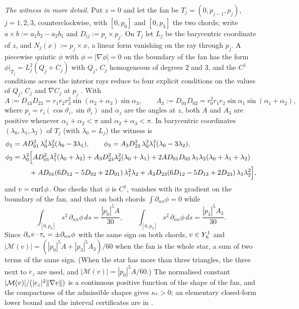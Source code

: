 \emph{The witness in more detail.} Put $z=0$ and let the fan be $T_j=(0,p_{j-1},p_j)$, $j=1,2,3$, counterclockwise, with $[0,p_0]$ and $[0,p_3]$ the two chords; write $a\times b:=a_1b_2-a_2b_1$ and $D_{ij}:=p_i\times p_j$. On $T_j$ let $L_j$ be the barycentric coordinate of $z$, and $N_j(x):=p_j\times x$, a linear form vanishing on the ray through $p_j$. A piecewise quintic $\phi$ with $\phi=|\nabla\phi|=0$ on the boundary of the fan has the form $\phi|_{T_j}=L_j^2(Q_j+C_j)$ with $Q_j$, $C_j$ homogeneous of degrees $2$ and $3$, and the $C^1$ conditions across the interior rays reduce to four explicit conditions on the values of $Q_j$, $C_j$ and $\nabla C_j$ at $p_j$ \cite{PadhiExt}. With
\[
A:=D_{13}D_{23}=r_1r_2r_3^2\sin(\alpha_2+\alpha_3)\sin\alpha_3,\qquad A_3:=D_{01}D_{02}=r_0^2r_1r_2\sin\alpha_1\sin(\alpha_1+\alpha_2),
\]
where $p_i=r_i(\cos\vartheta_i,\sin\vartheta_i)$ and $\alpha_j$ are the angles at $z$, both $A$ and $A_3$ are positive whenever $\alpha_1+\alpha_2<\pi$ and $\alpha_2+\alpha_3<\pi$. In barycentric coordinates $(\lambda_0,\lambda_1,\lambda_2)$ of $T_j$ (with $\lambda_0=L_j$) the witness is
\begin{align*}
\phi_1&=AD_{01}^2\,\lambda_0^2\lambda_2^2(\lambda_0-3\lambda_1),\qquad \phi_3=A_3D_{23}^2\,\lambda_0^2\lambda_1^2(\lambda_0-3\lambda_2),\\
\phi_2&=\lambda_0^2\Bigl[AD_{01}^2\lambda_1^2(\lambda_0+\lambda_2)+A_3D_{23}^2\lambda_2^2(\lambda_0+\lambda_1)+2AD_{01}D_{02}\,\lambda_1\lambda_2(\lambda_0+\lambda_1+\lambda_2)\\
&\qquad\ +AD_{01}(6D_{12}-5D_{02}+2D_{01})\,\lambda_1^2\lambda_2+A_3D_{23}(6D_{12}-5D_{13}+2D_{23})\,\lambda_1\lambda_2^2\Bigr],
\end{align*}
and $v=\operatorname{curl}\phi$. One checks that $\phi$ is $C^1$, vanishes with its gradient on the boundary of the fan, and that on both chords $\int\partial_{nn}\phi=0$ while
\[
\int_{[0,p_0]}s^2\,\partial_{nn}\phi\,ds=\frac{|p_0|^5A}{30},\qquad \int_{[0,p_3]}s^2\,\partial_{nn}\phi\,ds=\frac{|p_3|^5A_3}{30}.
\]
Since $\partial_n v\cdot\tau_e=\pm\partial_{nn}\phi$ with the same sign on both chords, $v\in Y_h^1$ and $|\mathcal M(v)|=(|p_0|^5A+|p_3|^5A_3)/60$ when the fan is the whole star, a sum of two terms of the same sign. (When the star has more than three triangles, the three next to $e_z$ are used, and $|\mathcal M(v)|=|p_0|^5A/60$.) The normalised constant $|\mathcal M(v)|/(|e_z|^2\lVert \nabla v\rVert)$ is a continuous positive function of the shape of the fan, and the compactness of the admissible shapes gives $\kappa_\ast>0$; an elementary closed-form lower bound and the interval certificates are in \cite{PadhiExt}.

